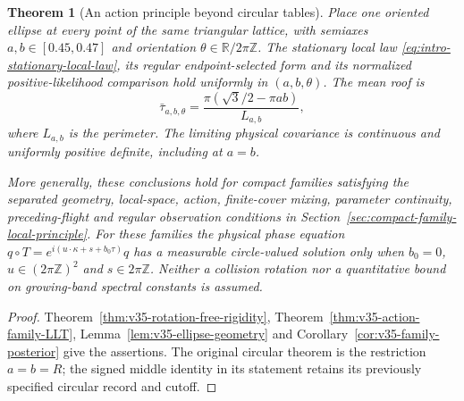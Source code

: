 \documentclass[11pt,reqno]{amsart}
\numberwithin{equation}{section}
\newtheorem{leadtheorem}{Theorem}
\theoremstyle{definition}\newtheorem{definition}[theorem]{Definition}
\theoremstyle{remark}\newtheorem{remark}[theorem]{Remark}
\newcommand{\R}{\mathbb R}\newcommand{\Z}{\mathbb Z}\newcommand{\T}{\mathbb T}
\begin{document}
\begin{leadtheorem}[An action principle beyond circular tables]
\label{thm:intro-action-family}
Place one oriented ellipse at every point of the same triangular lattice,
with semiaxes $a,b\in[0.45,0.47]$ and orientation $\theta\in\R/2\pi\Z$.
The stationary local law \eqref{eq:intro-stationary-local-law}, its regular
endpoint-selected form and its normalized positive-likelihood comparison
hold uniformly in $(a,b,\theta)$. The mean roof is
\[
 \bar\tau_{a,b,\theta}=\frac{\pi(\sqrt3/2-\pi ab)}{L_{a,b}},
\]
where $L_{a,b}$ is the perimeter. The limiting physical covariance is
continuous and uniformly positive definite, including at $a=b$.

More generally, these conclusions hold for compact families satisfying
the separated geometry, local-space, action, finite-cover mixing,
parameter continuity, preceding-flight and regular observation conditions in Section~\ref{sec:compact-family-local-principle}.
For these families the physical phase equation
$q\circ T=e^{i(u\cdot\kappa+s+b_0\tau)}q$ has a measurable circle-valued
solution only when $b_0=0$, $u\in(2\pi\Z)^2$ and $s\in2\pi\Z$.
Neither a collision rotation nor a quantitative bound on growing-band
spectral constants is assumed.
\end{leadtheorem}
\begin{proof}
Theorem~\ref{thm:v35-rotation-free-rigidity},
Theorem~\ref{thm:v35-action-family-LLT},
Lemma~\ref{lem:v35-ellipse-geometry} and
Corollary~\ref{cor:v35-family-posterior} give the assertions.
The original circular theorem is the restriction $a=b=R$; the signed
middle identity in its statement retains its previously specified
circular record and cutoff.
\end{proof}
\end{document}
